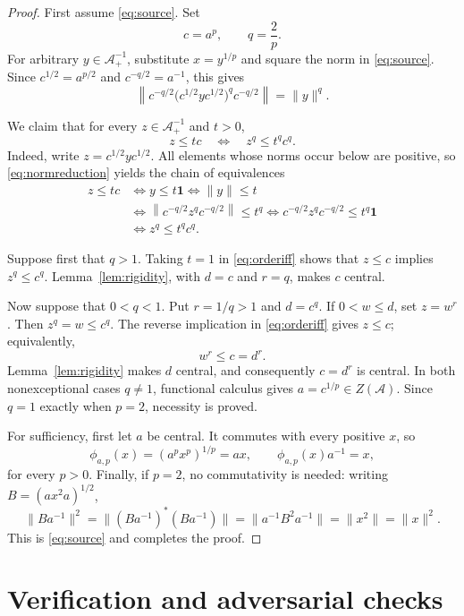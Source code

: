 \documentclass[11pt]{article}
\newcommand{\A}{\mathcal A}
\newcommand{\one}{\mathbf 1}
\newcommand{\Z}{Z(\A)}
\newcommand{\posinv}{\A_{+}^{-1}}
\begin{document}
\begin{proof}
First assume \eqref{eq:source}. Set
\[
 c=a^p,\qquad q=\frac{2}{p}.
\]
For arbitrary $y\in\posinv$, substitute $x=y^{1/p}$ and square the norm in
\eqref{eq:source}. Since $c^{1/2}=a^{p/2}$ and
$c^{-q/2}=a^{-1}$, this gives
\begin{equation}\label{eq:normreduction}
 \left\|c^{-q/2}\bigl(c^{1/2}yc^{1/2}\bigr)^q c^{-q/2}\right\|
 =\|y\|^q.
\end{equation}

We claim that for every $z\in\posinv$ and $t>0$,
\begin{equation}\label{eq:orderiff}
 z\le tc \quad\Longleftrightarrow\quad z^q\le t^q c^q.
\end{equation}
Indeed, write $z=c^{1/2}yc^{1/2}$. All elements whose norms occur below are
positive, so \eqref{eq:normreduction} yields the chain of equivalences
\begin{align*}
 z\le tc
 &\Longleftrightarrow y\le t\one
 \Longleftrightarrow \|y\|\le t\\
 &\Longleftrightarrow
 \left\|c^{-q/2}z^q c^{-q/2}\right\|\le t^q
 \Longleftrightarrow c^{-q/2}z^q c^{-q/2}\le t^q\one\\
 &\Longleftrightarrow z^q\le t^q c^q.
\end{align*}

Suppose first that $q>1$. Taking $t=1$ in \eqref{eq:orderiff} shows that
$z\le c$ implies $z^q\le c^q$. Lemma~\ref{lem:rigidity}, with $d=c$ and
$r=q$, makes $c$ central.

Now suppose that $0<q<1$. Put $r=1/q>1$ and $d=c^q$. If
$0<w\le d$, set $z=w^r$. Then
$z^q=w\le c^q$. The reverse implication in \eqref{eq:orderiff} gives
$z\le c$; equivalently,
\[
 w^r\le c=d^r.
\]
Lemma~\ref{lem:rigidity} makes $d$ central, and consequently
$c=d^r$ is central. In both nonexceptional cases $q\ne1$, functional
calculus gives $a=c^{1/p}\in\Z$. Since $q=1$ exactly when $p=2$, necessity
is proved.

For sufficiency, first let $a$ be central. It commutes with every positive
$x$, so
\[
 \phi_{a,p}(x)=(a^p x^p)^{1/p}=ax,
 \qquad \phi_{a,p}(x)a^{-1}=x,
\]
for every $p>0$. Finally, if $p=2$, no commutativity is needed: writing
$B=(ax^2a)^{1/2}$,
\[
 \|Ba^{-1}\|^2
 =\|(Ba^{-1})^*(Ba^{-1})\|
 =\|a^{-1}B^2a^{-1}\|
 =\|x^2\|=\|x\|^2.
\]
This is \eqref{eq:source} and completes the proof.
\end{proof}

\section{Verification and adversarial checks}
\end{document}
